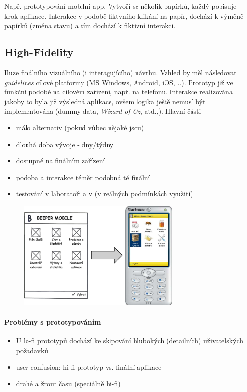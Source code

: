 \vspace{20px}

Např. prototypování mobilní app. Vytvoří se několik papírků, každý popisuje krok aplikace. Interakce v podobě fiktvního klikání na papír, dochází k výměně papírků (změna stavu) a tím dochází k fiktivní interakci.

\subsection{High-Fidelity}
Iluze finálního vizuálního (i interagujícího) návrhu. Vzhled by měl následovat \textit{guidelines} cílové platformy (MS Windows, Android, iOS, ..). Prototyp již ve funkční podobě na cílovém zařízení, např. na telefonu. Interakce realizována jakoby to byla již výsledná aplikace, ovšem logika ještě nemusí být implementována (dummy data, \textit{Wizard of Oz}, atd.,). Hlavní části

\begin{itemize}[itemsep=0px]
\item málo alternativ (pokud vůbec nějaké jsou)
\item dlouhá doba vývoje - dny/týdny
\item dostupné na finálním zařízení
\item podoba a interakce téměr podobná té finální
\item testování v laboratoři a v  (v reálných podmínkách využití)
\end{itemize}

\begin{figure}[h!]
\centering
\includegraphics[width=80mm]{06/images/hifi}
\end{figure}

\paragraph{Problémy s prototypováním}
\begin{itemize}[itemsep=0px]
\item U lo-fi prototypů dochází ke skipování hlubokých (detailních) uživatelských požadavků
\item user confusion: hi-fi prototyp vs. finální aplikace
\item drahé a žrout času (speciálně hi-fi)
\end{itemize}